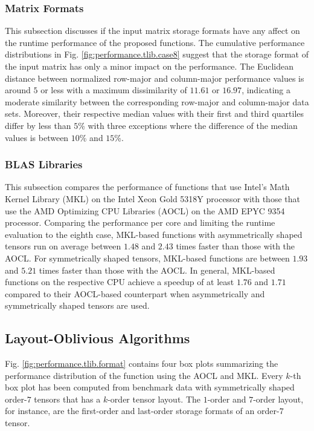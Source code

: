 \subsubsection{Matrix Formats}
This subsection discusses if the input matrix storage formats have any affect on the runtime performance of the proposed functions.
The cumulative performance distributions in Fig. \ref{fig:performance.tlib.case8} suggest that the storage format of the input matrix has only a minor impact on the performance.
The Euclidean distance between normalized row-major and column-major performance values is around $5$ or less with a maximum dissimilarity of $11.61$ or $16.97$, indicating a moderate similarity between the corresponding row-major and column-major data sets.
Moreover, their respective median values with their first and third quartiles differ by less than $5$\% with three exceptions where the difference of the median values is between $10$\% and $15$\%.


\subsubsection{BLAS Libraries}
This subsection compares the performance of functions that use Intel's Math Kernel Library (MKL) on the Intel Xeon Gold 5318Y processor with those that use the AMD Optimizing CPU Libraries (AOCL) on the AMD EPYC 9354 processor. 
Comparing the performance per core and limiting the runtime evaluation to the eighth case, MKL-based functions with asymmetrically shaped tensors run on average between $1.48$ and $2.43$ times faster than those with the AOCL.
For symmetrically shaped tensors, MKL-based functions are between $1.93$ and $5.21$ times faster than those with the AOCL.
In general, MKL-based functions on the respective CPU achieve a speedup of at least $1.76$ and $1.71$ compared to their AOCL-based counterpart when asymmetrically and symmetrically shaped tensors are used.



\subsection{Layout-Oblivious Algorithms}
Fig. \ref{fig:performance.tlib.format} contains four box plots summarizing the performance distribution of the  function using the AOCL and MKL.
Every $k$-th box plot has been computed from benchmark data with symmetrically shaped order-$7$ tensors that has a $k$-order tensor layout.
The $1$-order and $7$-order layout, for instance, are the first-order and last-order storage formats of an order-$7$ tensor.

